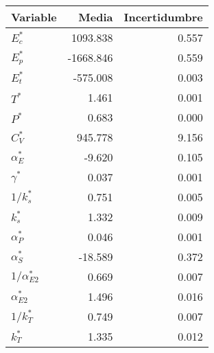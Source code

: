 \begin{tabular}{lrr}
\toprule
Variable & Media & Incertidumbre \\
\midrule
$E_c^*$ & 1093.838 & 0.557 \\
$E_p^*$ & -1668.846 & 0.559 \\
$E_t^*$ & -575.008 & 0.003 \\
$T^*$ & 1.461 & 0.001 \\
$P^*$ & 0.683 & 0.000 \\
$C_V^*$ & 945.778 & 9.156 \\
$\alpha_E^*$ & -9.620 & 0.105 \\
$\gamma^*$ & 0.037 & 0.001 \\
$1/k_s^*$ & 0.751 & 0.005 \\
$k_s^*$ & 1.332 & 0.009 \\
$\alpha_P^*$ & 0.046 & 0.001 \\
$\alpha_S^*$ & -18.589 & 0.372 \\
$1/\alpha_{E2}^*$ & 0.669 & 0.007 \\
$\alpha_{E2}^*$ & 1.496 & 0.016 \\
$1/k_T^*$ & 0.749 & 0.007 \\
$k_T^*$ & 1.335 & 0.012 \\
\bottomrule
\end{tabular}
